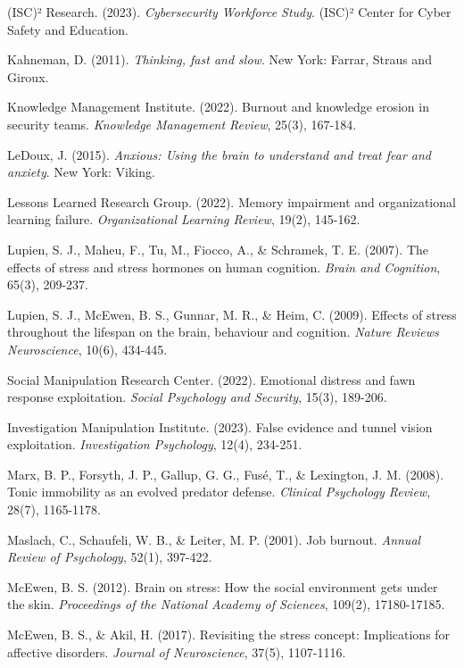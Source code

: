 \documentclass[11pt,a4paper]{article}
\begin{document}
\begin{thebibliography}{99}
(ISC)² Research. (2023). \textit{Cybersecurity Workforce Study}. (ISC)² Center for Cyber Safety and Education.

Kahneman, D. (2011). \textit{Thinking, fast and slow}. New York: Farrar, Straus and Giroux.

Knowledge Management Institute. (2022). Burnout and knowledge erosion in security teams. \textit{Knowledge Management Review}, 25(3), 167-184.

LeDoux, J. (2015). \textit{Anxious: Using the brain to understand and treat fear and anxiety}. New York: Viking.

Lessons Learned Research Group. (2022). Memory impairment and organizational learning failure. \textit{Organizational Learning Review}, 19(2), 145-162.

Lupien, S. J., Maheu, F., Tu, M., Fiocco, A., \& Schramek, T. E. (2007). The effects of stress and stress hormones on human cognition. \textit{Brain and Cognition}, 65(3), 209-237.

Lupien, S. J., McEwen, B. S., Gunnar, M. R., \& Heim, C. (2009). Effects of stress throughout the lifespan on the brain, behaviour and cognition. \textit{Nature Reviews Neuroscience}, 10(6), 434-445.

Social Manipulation Research Center. (2022). Emotional distress and fawn response exploitation. \textit{Social Psychology and Security}, 15(3), 189-206.

Investigation Manipulation Institute. (2023). False evidence and tunnel vision exploitation. \textit{Investigation Psychology}, 12(4), 234-251.

Marx, B. P., Forsyth, J. P., Gallup, G. G., Fusé, T., \& Lexington, J. M. (2008). Tonic immobility as an evolved predator defense. \textit{Clinical Psychology Review}, 28(7), 1165-1178.

Maslach, C., Schaufeli, W. B., \& Leiter, M. P. (2001). Job burnout. \textit{Annual Review of Psychology}, 52(1), 397-422.

McEwen, B. S. (2012). Brain on stress: How the social environment gets under the skin. \textit{Proceedings of the National Academy of Sciences}, 109(2), 17180-17185.

McEwen, B. S., \& Akil, H. (2017). Revisiting the stress concept: Implications for affective disorders. \textit{Journal of Neuroscience}, 37(5), 1107-1116.


\end{thebibliography}
\end{document}
